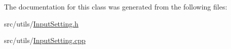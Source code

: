 The documentation for this class was generated from the following files\-:\begin{DoxyCompactItemize}
\item 
src/utils/\hyperlink{InputSetting_8h}{Input\-Setting.\-h}\item 
src/utils/\hyperlink{InputSetting_8cpp}{Input\-Setting.\-cpp}\end{DoxyCompactItemize}
